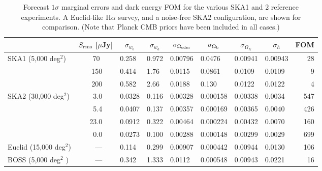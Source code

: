 \documentclass[useAMS,usenatbib]{mn2e}
\begin{document}
\begin{table}
{\renewcommand{\arraystretch}{1.5}
\begin{tabular}{ lrllllllr}
\hline 
 & \multicolumn{1}{c}{$S_{\rm rms}$ [$\mu$Jy]} & \multicolumn{1}{c}{$\sigma_{w_0}$} &  \multicolumn{1}{c}{$\sigma_{w_a}$} &  \multicolumn{1}{c}{$\sigma_{\Omega_{\rm cdm}}$} & \multicolumn{1}{c}{$\sigma_{\Omega_{\rm b}}$} & \multicolumn{1}{c}{$\sigma_{\Omega_K}$} & \multicolumn{1}{c}{$\sigma_{h}$} & \multicolumn{1}{c}{FOM} \\
\hline
\multirow{3}{*}{SKA1 (5,000 deg$^2$)}
 & 70  ~~~	&  0.258 & 0.972 & 0.00796 &  0.0476 &  0.00941 &  0.00943 &  28 \\
 & 150~~~	&  0.414 &  1.76  & 0.0115   &  0.0861 &  0.0109   &  0.0109   & 9  \\
 & 200~~~ & 0.582  &  2.66  & 0.0188   &  0.130   &  0.0122   &  0.0122   & 4 \\
\hline
\multirow{4}{*}{SKA2 (30,000 deg$^2$)}
  & 3.0~~~	&0.0328 & 0.116 & 0.00328 & 0.000158 & 0.00338 & 0.0034 & 547  \\
   &5.4~~~	&0.0407 & 0.137 & 0.00357 & 0.000169 & 0.00365 & 0.0040 & 426  \\
  & 23.0~~~ 	& 0.0912 & 0.322 & 0.00464 & 0.000224 & 0.00432& 0.0070 & 160  \\
\cline{2-9}%
 & 0.0~~~	& 0.0273 & 0.100 & 0.00288 & 0.000148 & 0.00299 & 0.0029 & 699  \\
  \hline
\multirow{1}{*}{Euclid (15,000 deg$^2$)} & ---~~~ & 0.114 & 0.299 & 0.00907 & 0.000442 & 0.00944 & 0.0130 & 106  \\
\multirow{1}{*}{BOSS (5,000 deg$^2$ )}&---~~~& 0.342 & 1.333 & 0.0112 & 0.000548 & 0.00943 & 0.0221 & 16  \\

\hline
\end{tabular} }
\caption{Forecast $1\sigma$ marginal errors and dark energy FOM for the various SKA1 and 2 reference experiments. A Euclid-like H$\alpha$ survey, and a noise-free SKA2 configuration, are shown for comparison. (Note that Planck CMB priors have been included in all cases.)}
\label{tab:marginals}\vspace{-1em}
\end{table}
\end{document}
